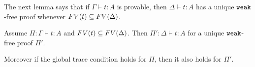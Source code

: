 
The next lemma says that if $\Gamma\vdash t:A$ is provable,
then $\Delta\vdash t:A$ has a unique ${\tt weak}$-free proof whenever 
${{\relax FV}}(t) \subseteq {{\relax FV}}(\Delta)$.

\begin{lemma}[Thinning]
  \label{lem:thinning}
  Assume $\Pi:\Gamma\vdash t:A$ and ${{\relax FV}}(t) \subseteq {{\relax FV}}(\Delta)$.
  Then $\Pi':\Delta \vdash t:A$ for a unique ${\tt weak}$-free
  proof $\Pi'$.
  
  Moreover if the global trace condition holds for $\Pi$, 
  then it also holds for $\Pi'$. 
\end{lemma}


